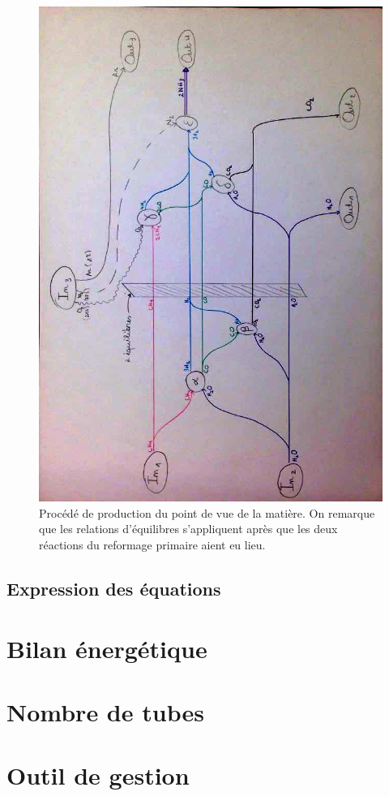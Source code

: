 \documentclass[a4paper,12pt]{article}
\begin{document}
\begin{figure}
    \centering
    \includegraphics[width=\textwidth]{flows_matter}
    \caption{
        Procédé de production du point de vue de la matière.
        On remarque que les relations d'équilibres s'appliquent après que les deux
        réactions du reformage primaire aient eu lieu.
    }
    \label{fig:flows-matter}
\end{figure}

\subsection{Expression des équations}



\section{Bilan énergétique}
\section{Nombre de tubes}
\section{Outil de gestion}

\printbibliography[heading=bibintoc]
\end{document}
